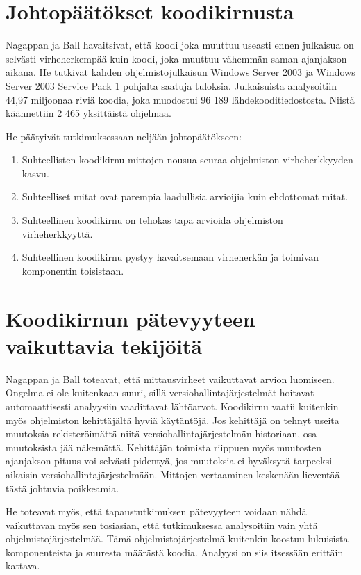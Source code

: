 \documentclass[finnish]{../tktltiki2}
\theoremstyle{definition}
\theoremstyle{remark}
\begin{document}
\section{Johtopäätökset koodikirnusta}

Nagappan ja Ball havaitsivat, että koodi joka muuttuu useasti ennen julkaisua on selvästi virheherkempää kuin koodi, joka muuttuu vähemmän saman ajanjakson aikana. He tutkivat kahden ohjelmistojulkaisun Windows Server 2003 ja Windows Server 2003 Service Pack 1 pohjalta saatuja tuloksia. Julkaisuista analysoitiin 44,97 miljoonaa riviä koodia, joka muodostui 96 189 lähdekooditiedostosta. Niistä käännettiin 2 465 yksittäistä ohjelmaa.\newline

\noindent He päätyivät tutkimuksessaan neljään johtopäätökseen:

\begin{enumerate}
    \item Suhteellisten koodikirnu-mittojen nousua seuraa ohjelmiston virheherkkyyden kasvu.
    \item Suhteelliset mitat ovat parempia laadullisia arvioijia kuin ehdottomat mitat.
    \item Suhteellinen koodikirnu on tehokas tapa arvioida ohjelmiston virheherkkyyttä.
    \item Suhteellinen koodikirnu pystyy havaitsemaan virheherkän ja toimivan komponentin toisistaan.
\end{enumerate}

\section{Koodikirnun pätevyyteen vaikuttavia tekijöitä}

Nagappan ja Ball toteavat, että mittausvirheet vaikuttavat arvion luomiseen. Ongelma ei ole kuitenkaan suuri, sillä versiohallintajärjestelmät hoitavat automaattisesti analyysiin vaadittavat lähtöarvot. Koodikirnu vaatii kuitenkin myös ohjelmiston kehittäjältä hyviä käytäntöjä. Jos kehittäjä on tehnyt useita muutoksia rekisteröimättä niitä versiohallintajärjestelmän historiaan, osa muutoksista jää näkemättä. Kehittäjän toimista riippuen myös muutosten ajanjakson pituus voi selvästi pidentyä, jos muutoksia ei hyväksytä tarpeeksi aikaisin versiohallintajärjestelmään. Mittojen vertaaminen keskenään lieventää tästä johtuvia poikkeamia.

He toteavat myös, että tapaustutkimuksen pätevyyteen voidaan nähdä vaikuttavan myös sen tosiasian, että tutkimuksessa analysoitiin vain yhtä ohjelmistojärjestelmää. Tämä ohjelmistojärjestelmä kuitenkin koostuu lukuisista komponenteista ja suuresta määrästä koodia. Analyysi on siis itsessään erittäin kattava.
\end{document}
